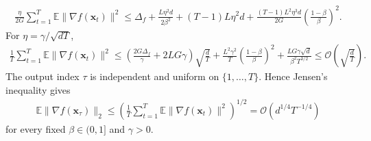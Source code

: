 \documentclass[10pt,a4paper]{amsart}
\theoremstyle{plain}
\theoremstyle{definition}
\def \E {\mathbb{E}}
\def \x {\mathbf{x}}
\begin{document}
\begin{align*}
 \frac\eta{2G}\sum_{t=1}^T\E\|\nabla f(\x_t)\|^2
 \le\Delta_f+\frac{L\eta^2d}{2\beta^2}
      +(T-1)L\eta^2d
      +\frac{(T-1)L^2\eta^3d}{2G}
         \left(\frac{1-\beta}{\beta}\right)^2.
\end{align*}
For $\eta=\gamma/\sqrt{dT}$,
\begin{align*}
 \frac1T\sum_{t=1}^T\E\|\nabla f(\x_t)\|^2
 \le\left(\frac{2G\Delta_f}{\gamma}+2LG\gamma\right)\sqrt{\frac dT}
       +\frac{L^2\gamma^2}{T}\left(\frac{1-\beta}{\beta}\right)^2
       +\frac{LG\gamma\sqrt d}{\beta^2T^{3/2}}
       \le\mathcal{O}\left(\sqrt{\frac dT}\right).
\end{align*}
The output index $\tau$ is independent and uniform on $\{1,\ldots,T\}$. Hence Jensen's inequality gives
\begin{align*}
 \E\|\nabla f(\x_\tau)\|_2
 \le\left(\frac1T\sum_{t=1}^T\E\|\nabla f(\x_t)\|^2\right)^{1/2}
 =\mathcal O(d^{1/4}T^{-1/4})
\end{align*}
for every fixed $\beta\in(0,1]$ and $\gamma>0$. 
\end{document}
